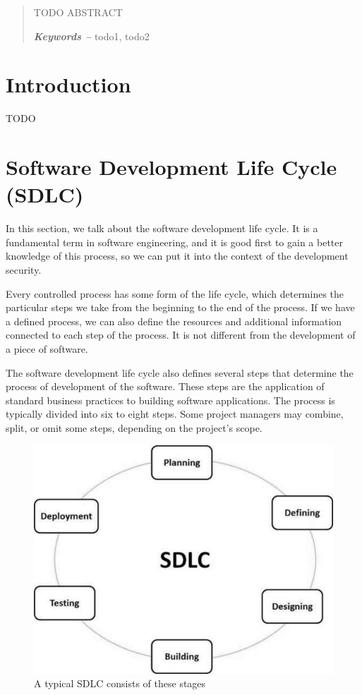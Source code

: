 \documentclass[12pt,a4,twoside]{article}
\providecommand{\keywords}[1]
{
    \small	
    \textbf{\textit{Keywords -- }} #1
}
\begin{document}
\newpage

\begin{abstract}

TODO ABSTRACT\\

\noindent
\keywords{todo1, todo2}
\end{abstract}

\tableofcontents
\newpage

\section*{Introduction}

TODO

\newpage

\section{Software Development Life Cycle (SDLC)}
\label{sec:sdlc}

In this section, we talk about the software development life cycle. It is a fundamental term in software engineering, and it is good first to gain a better knowledge of this process, so we can put it into the context of the development security.

Every controlled process has some form of the life cycle, which determines the particular steps we take from the beginning to the end of the process. If we have a defined process, we can also define the resources and additional information connected to each step of the process. It is not different from the development of a piece of software.

The software development life cycle also defines several steps that determine the process of development of the software. These steps are the application of standard business practices to building software applications. The process is typically divided into six to eight steps. Some project managers may combine, split, or omit some steps, depending on the project's scope. \cite{sdlc_phoenix}

\begin{figure}[h]
\centering
\includegraphics[width=.8\textwidth]{figures/sdlc_stages.jpg}
\caption{A typical SDLC consists of these stages \cite{sdlc_tutorials_point}}
\label{fig:sdlc_stages}
\end{figure}
\end{document}
